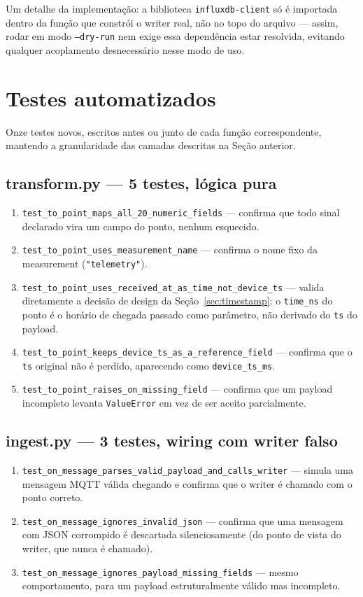 \documentclass[11pt,a4paper]{article}
\begin{document}
Um detalhe da implementação: a biblioteca \texttt{influxdb-client} só é importada dentro da função que constrói o writer real, não no topo do arquivo --- assim, rodar em modo \texttt{--dry-run} nem exige essa dependência estar resolvida, evitando qualquer acoplamento desnecessário nesse modo de uso.

\section{Testes automatizados}

Onze testes novos, escritos antes ou junto de cada função correspondente, mantendo a granularidade das camadas descritas na Seção anterior.

\subsection{transform.py --- 5 testes, lógica pura}

\begin{enumerate}[label=\textbf{Teste \arabic*}]
    \item \texttt{test\_to\_point\_maps\_all\_20\_numeric\_fields} --- confirma que todo sinal declarado vira um campo do ponto, nenhum esquecido.
    \item \texttt{test\_to\_point\_uses\_measurement\_name} --- confirma o nome fixo da measurement (\texttt{"telemetry"}).
    \item \texttt{test\_to\_point\_uses\_received\_at\_as\_time\_not\_device\_ts} --- valida diretamente a decisão de design da Seção~\ref{sec:timestamp}: o \texttt{time\_ns} do ponto é o horário de chegada passado como parâmetro, não derivado do \texttt{ts} do payload.
    \item \texttt{test\_to\_point\_keeps\_device\_ts\_as\_a\_reference\_field} --- confirma que o \texttt{ts} original não é perdido, aparecendo como \texttt{device\_ts\_ms}.
    \item \texttt{test\_to\_point\_raises\_on\_missing\_field} --- confirma que um payload incompleto levanta \texttt{ValueError} em vez de ser aceito parcialmente.
\end{enumerate}

\subsection{ingest.py --- 3 testes, wiring com writer falso}

\begin{enumerate}[label=\textbf{Teste \arabic*}]
    \item \texttt{test\_on\_message\_parses\_valid\_payload\_and\_calls\_writer} --- simula uma mensagem MQTT válida chegando e confirma que o writer é chamado com o ponto correto.
    \item \texttt{test\_on\_message\_ignores\_invalid\_json} --- confirma que uma mensagem com JSON corrompido é descartada silenciosamente (do ponto de vista do writer, que nunca é chamado).
    \item \texttt{test\_on\_message\_ignores\_payload\_missing\_fields} --- mesmo comportamento, para um payload estruturalmente válido mas incompleto.
\end{enumerate}
\end{document}
